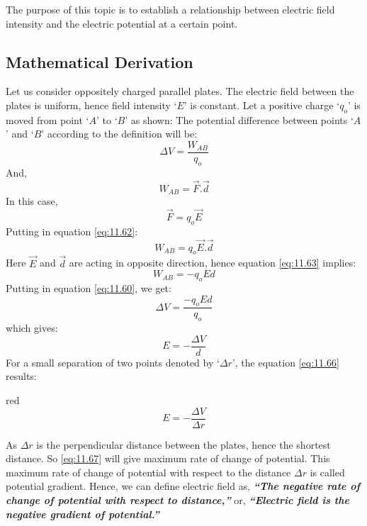 The purpose of this topic is to establish a relationship between electric
field intensity and the electric potential at a certain point.

\subsection*{Mathematical Derivation}
Let us consider oppositely charged parallel plates.
The electric field between the plates is uniform, hence field intensity
`$E$' is constant. Let a positive charge `$q_{o}$’ is moved
from point `$A$' to `$B$' as shown:
The potential difference between points `$A$' and `$B$' according to the
definition will be:
\begin{equation}\label{eq:11.60}
  \Delta V = \frac{W_{AB}}{q_{o}}  
\end{equation}
And,
\begin{equation}\label{eq:11.61}
  W_{AB} = \vec{F}.\vec{d} 
\end{equation}
In this case, 
\begin{equation}\label{eq:11.62}
  \vec{F} = q_{o}\vec{E}
\end{equation}
Putting in equation \ref{eq:11.62}:
\begin{equation}\label{eq:11.63}
  W_{AB} = q_{o}\vec{E}.\vec{d} 
\end{equation}
Here $\vec{E}$ and $\vec{d}$ are acting in opposite direction, hence equation
\ref{eq:11.63} implies:
\begin{equation}\label{eq:11.64}
  W_{AB} = -q_{o}Ed 
\end{equation}
Putting in equation \ref{eq:11.60}, we get:
\begin{equation}\label{eq:11.65}
  \Delta V = \frac{-q_{o}Ed}{q_{o}}  
\end{equation}
which gives:
\begin{equation}\label{eq:11.66}
  E = -\frac{\Delta V}{d}
\end{equation}
For a small separation of two points denoted by `$\Delta r$', the
equation \ref{eq:11.66} results:
\begin{mybox}{red}{}
\begin{equation}\label{eq:11.67}
  E = -\frac{\Delta V}{\Delta r}
\end{equation}
\end{mybox}
As $\Delta r$ is the perpendicular distance between the plates, hence the
shortest distance. So \ref{eq:11.67} will give maximum rate of change of potential.
This maximum rate of change of potential with respect to the distance $\Delta r$
is called potential gradient. Hence, we can define electric field as,
\textit{\textbf{“The negative rate of change of potential with respect
to distance,”}} or, \textit{\textbf{“Electric field is the negative gradient of potential.”}}
